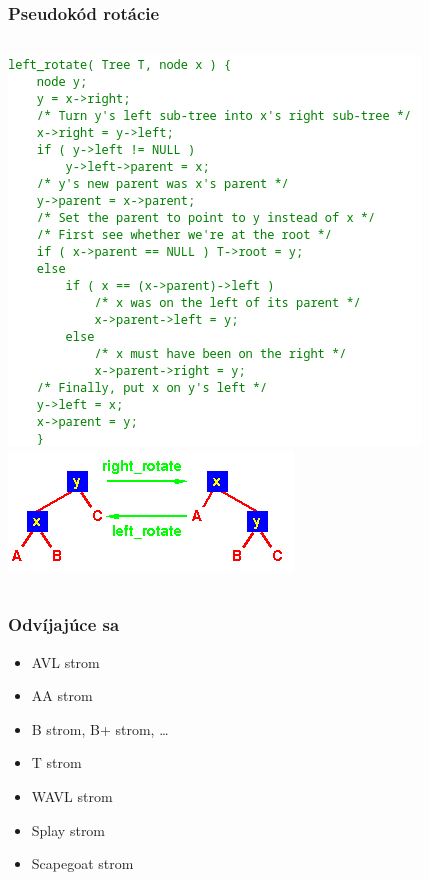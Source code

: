 \documentclass{beamer}
\begin{document}
    \begin{frame}
        \frametitle{Pseudokód rotácie}
        \begin{columns}
            \includegraphics[width=\textwidth]{pic/code}
            \includegraphics[width=\textwidth]{pic/rot}
        \end{columns}
    \end{frame}

    \begin{frame}
        \frametitle{Odvíjajúce sa}
        \begin{itemize}
            \item AVL strom
            \item AA strom
            \item B strom, B+ strom, \ldots
            \item T strom
            \item WAVL strom
            \item Splay strom
            \item Scapegoat strom
        \end{itemize}
    \end{frame}
\end{document}
